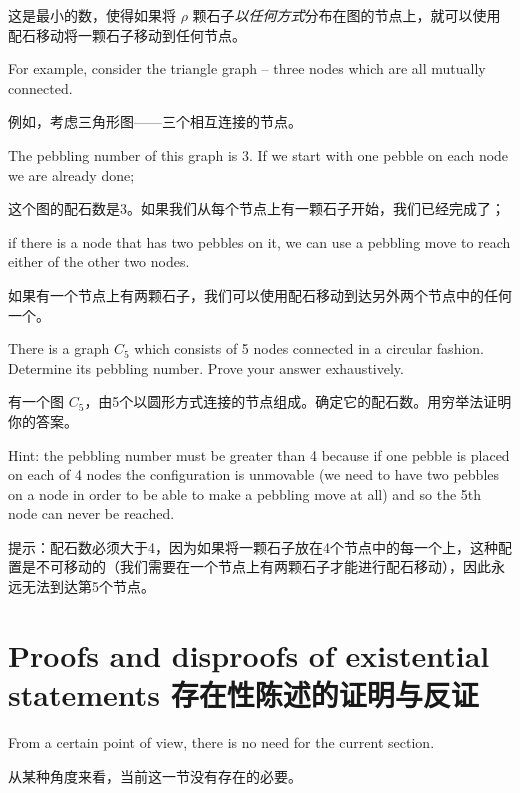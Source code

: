 这是最小的数，使得如果将 $\rho$ 颗石子{\em 以任何方式}分布在图的节点上，就可以使用配石移动将一颗石子移动到任何节点。

For example, consider the triangle graph -- three nodes which are all 
mutually connected.

例如，考虑三角形图——三个相互连接的节点。

The pebbling number of this graph is 3.  If we
start with one pebble on each node we are already done;

这个图的配石数是3。如果我们从每个节点上有一颗石子开始，我们已经完成了；

if there is a 
node that has two pebbles on it, we can use a pebbling move to reach
either of the other two nodes.

如果有一个节点上有两颗石子，我们可以使用配石移动到达另外两个节点中的任何一个。

\begin{exer} 
There is a graph $C_5$ which consists of 5 nodes connected in a circular
fashion.  Determine its pebbling number.
Prove your answer exhaustively.

有一个图 $C_5$，由5个以圆形方式连接的节点组成。确定它的配石数。用穷举法证明你的答案。

Hint: the pebbling number must be greater than 4 because if one pebble is
placed on each of 4 nodes the configuration is unmovable (we need to 
have two pebbles on a node in order to be able to make a pebbling move
at all) and so the 5th node can never be reached.

提示：配石数必须大于4，因为如果将一颗石子放在4个节点中的每一个上，这种配置是不可移动的（我们需要在一个节点上有两颗石子才能进行配石移动），因此永远无法到达第5个节点。
\end{exer}
 
\clearpage





\newpage


\section[Existential statements]{Proofs and disproofs of existential statements 存在性陈述的证明与反证}
\label{sec:exist}

From a certain point of view, there is no need for the current section.

从某种角度来看，当前这一节没有存在的必要。

